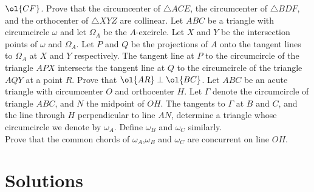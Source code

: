 \documentclass{seto}
\begin{document}
$\ol{CF}$. Prove that the circumcenter of $\triangle ACE$, the
circumcenter of $\triangle BDF$, and the orthocenter of $\triangle XYZ$ are
collinear.
\exercise[SL 2021/G8]Let $ABC$ be a triangle with circumcircle $\omega$ and let
$\Omega_A$ be the $A$-excircle. Let $X$ and $Y$ be the intersection points of
$\omega$ and $\Omega_A$. Let $P$ and $Q$ be the projections of $A$ onto the
tangent lines to $\Omega_A$ at $X$ and $Y$ respectively. The tangent line at $P$
to the circumcircle of the triangle $APX$ intersects the tangent line at $Q$ to
the circumcircle of the triangle $AQY$ at a point $R$. Prove that $\ol{AR}
\perp \ol{BC}$.
\exercise[USEMO 2020/3]Let $ABC$ be an acute triangle with circumcenter $O$ and
orthocenter $H$. Let $\Gamma$ denote the circumcircle of triangle $ABC$, and $N$
the midpoint of $OH$. The tangents to $\Gamma$ at $B$ and $C$, and the line
through $H$ perpendicular to line $AN$, determine a triangle whose circumcircle
we denote by $\omega_A$. Define $\omega_B$ and $\omega_C$ similarly. \\
Prove that the common chords of $\omega_A$,$\omega_B$ and $\omega_C$ are
concurrent on line $OH$. 
%
%
\newpage
\section{Solutions}
\end{document}
